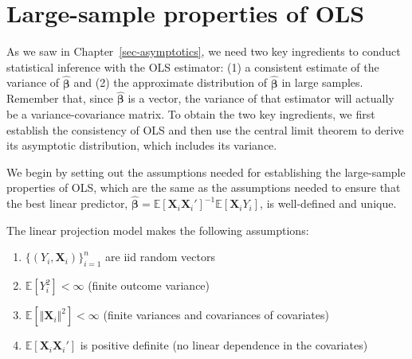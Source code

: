 \documentclass[
  13pt,
  letterpaper,
  DIV=11,
  numbers=noendperiod]{scrreprt}
\newcommand{\mb}{\symbf}
\newcommand{\E}{\mathbb{E}}
\newcommand{\X}{\mb{X}}
\newcommand{\bhat}{\widehat{\mb{\beta}}}
\theoremstyle{definition}
\theoremstyle{definition}
\theoremstyle{plain}
\theoremstyle{remark}
\begin{document}
\section{Large-sample properties of
OLS}\label{large-sample-properties-of-ols}

As we saw in Chapter~\ref{sec-asymptotics}, we need two key ingredients
to conduct statistical inference with the OLS estimator: (1) a
consistent estimate of the variance of \(\bhat\) and (2) the approximate
distribution of \(\bhat\) in large samples. Remember that, since
\(\bhat\) is a vector, the variance of that estimator will actually be a
variance-covariance matrix. To obtain the two key ingredients, we first
establish the consistency of OLS and then use the central limit theorem
to derive its asymptotic distribution, which includes its variance.

We begin by setting out the assumptions needed for establishing the
large-sample properties of OLS, which are the same as the assumptions
needed to ensure that the best linear predictor,
\(\bhat = \E[\X_{i}\X_{i}']^{-1}\E[\X_{i}Y_{i}]\), is well-defined and
unique.

\begin{tcolorbox}[enhanced jigsaw, leftrule=.75mm, colbacktitle=quarto-callout-note-color!10!white, title=\textcolor{quarto-callout-note-color}{\faInfo}\hspace{0.5em}{Linear projection assumptions}, toptitle=1mm, breakable, left=2mm, toprule=.15mm, arc=.35mm, opacitybacktitle=0.6, opacityback=0, colback=white, rightrule=.15mm, titlerule=0mm, colframe=quarto-callout-note-color-frame, bottomtitle=1mm, bottomrule=.15mm, coltitle=black]

The linear projection model makes the following assumptions:

\begin{enumerate}
\def\labelenumi{\arabic{enumi}.}
\item
  \(\{(Y_{i}, \X_{i})\}_{i=1}^n\) are iid random vectors
\item
  \(\E[Y^{2}_{i}] < \infty\) (finite outcome variance)
\item
  \(\E[\Vert \X_{i}\Vert^{2}] < \infty\) (finite variances and
  covariances of covariates)
\item
  \(\E[\X_{i}\X_{i}']\) is positive definite (no linear dependence in
  the covariates)
\end{enumerate}

\end{tcolorbox}
\end{document}
